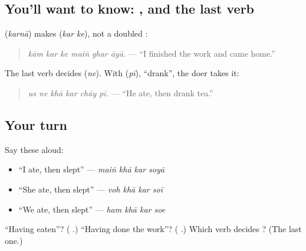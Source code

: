 \subsection*{You'll want to know:  , and the last verb}
\textbf{} (\emph{karnā}) makes \textbf{ } (\emph{kar ke}), not a doubled \textbf{}:

\begin{quote}
\textbf{     }
\end{quote}

\begin{quote}
\emph{kām kar ke maiṅ ghar āyā.} — \textquotedblleft{}I finished the work and came home.\textquotedblright{}
\end{quote}

The last verb decides \textbf{} (\emph{ne}). With \textbf{} (\emph{pī}), \textquotedblleft{}drank\textquotedblright{}, the doer takes it:

\begin{quote}
\textbf{     }
\end{quote}

\begin{quote}
\emph{us ne khā kar chāy pī.} — \textquotedblleft{}He ate, then drank tea.\textquotedblright{}
\end{quote}

\subsection*{Your turn}
Say these aloud:

\begin{itemize}
\raggedright
  \item \textquotedblleft{}I ate, then slept\textquotedblright{} — \emph{maiṅ khā kar soyā}
  \item \textquotedblleft{}She ate, then slept\textquotedblright{} — \emph{voh khā kar soī}
  \item \textquotedblleft{}We ate, then slept\textquotedblright{} — \emph{ham khā kar soe}
\end{itemize}

\begin{tcolorbox}[breakable,colback=teal!4,colframe=teal!35!black,title={Before you move on}]
\textquotedblleft{}Having eaten\textquotedblright{}? (\textbf{ }.) \textquotedblleft{}Having done the work\textquotedblright{}? (\textbf{  }.) Which verb decides \textbf{}? (The last one.)
\end{tcolorbox}
